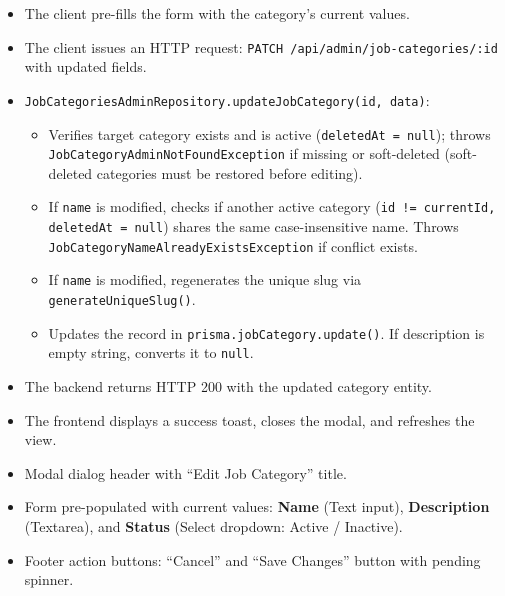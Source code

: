 \begin{itemize}[leftmargin=1.6em,topsep=3pt,itemsep=2pt,parsep=0pt,label=$\bullet$]
    \item The client pre-fills the form with the category's current values.
    \item The client issues an HTTP request: \texttt{PATCH /api/admin/job-categories/:id} with updated fields.
    \item \texttt{JobCategoriesAdminRepository.updateJobCategory(id, data)}:
        \begin{itemize}[leftmargin=1.6em,topsep=2pt,itemsep=2pt,parsep=0pt]
            \item Verifies target category exists and is active (\texttt{deletedAt = null}); throws \texttt{JobCategory\-Admin\-Not\-Found\-Exception} if missing or soft-deleted (soft-deleted categories must be restored before editing).
            \item If \texttt{name} is modified, checks if another active category (\texttt{id != currentId, deletedAt = null}) shares the same case-insensitive name. Throws \texttt{JobCategory\-Name\-Already\-Exists\-Exception} if conflict exists.
            \item If \texttt{name} is modified, regenerates the unique slug via \texttt{generateUniqueSlug()}.
            \item Updates the record in \texttt{prisma.jobCategory.update()}. If description is empty string, converts it to \texttt{null}.
        \end{itemize}
    \item The backend returns HTTP 200 with the updated category entity.
    \item The frontend displays a success toast, closes the modal, and refreshes the view.
\end{itemize}

\begin{itemize}[leftmargin=1.6em,topsep=3pt,itemsep=2pt,parsep=0pt,label=$\bullet$]
    \item Modal dialog header with ``Edit Job Category'' title.
    \item Form pre-populated with current values: \textbf{Name} (Text input), \textbf{Description} (Textarea), and \textbf{Status} (Select dropdown: Active / Inactive).
    \item Footer action buttons: ``Cancel'' and ``Save Changes'' button with pending spinner.
\end{itemize}

